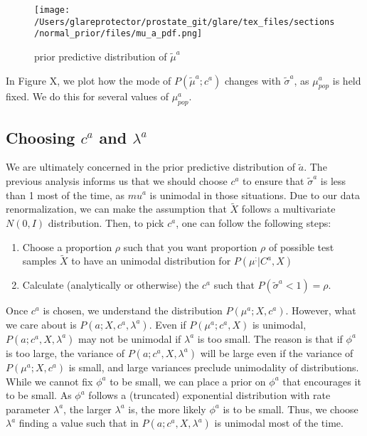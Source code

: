 \begin{figure}
\begin{center}
\texttt{[image: /Users/glareprotector/prostate\_git/glare/tex\_files/sections/normal\_prior/files/mu\_a\_pdf.png]}
\caption{prior predictive distribution of $\tilde{\mu}^a$}
\end{center}
\end{figure}

In Figure X, we plot how the mode of $P(\tilde{\mu}^a;c^a)$ changes with $\tilde{\sigma}^a$, as $\mu_{pop}^a$ is held fixed.  We do this for several values of $\mu_{pop}^a$.

\subsection{Choosing $c^a$ and $\lambda^a$}

We are ultimately concerned in the prior predictive distribution of $\tilde{a}$.  The previous analysis informs us that we should choose $c^a$ to ensure that $\tilde{\sigma}^a$ is less than 1 most of the time, as $mu^a$ is unimodal in those situations.  Due to our data renormalization, we can make the assumption that $\tilde{X}$ follows a multivariate $N(0,I)$ distribution.  Then, to pick $c^a$, one can follow the following steps:

\begin{enumerate}
  \item Choose a proportion $\rho$ such that you want proportion $\rho$ of possible test samples $\tilde{X}$ to have an unimodal distribution for $P(\mu^;|C^a,X)$
  \item Calculate (analytically or otherwise) the $c^a$ such that $P(\tilde{\sigma}^a < 1) = \rho$.
\end{enumerate}

Once $c^a$ is chosen, we understand the distribution $P(\mu^a;X,c^a)$.  However, what we care about is $P(a;X,c^a,\lambda^a)$.  Even if $P(\mu^a;c^a,X)$ is unimodal, $P(a;c^a,X,\lambda^a)$ may not be unimodal if $\lambda^a$ is too small.  The reason is that if $\phi^a$ is too large, the variance of $P(a;c^a,X,\lambda^a)$ will be large even if the variance of $P(\mu^a;X,c^a)$ is small, and large variances preclude unimodality of distributions.  While we cannot fix $\phi^a$ to be small, we can place a prior on $\phi^a$ that encourages it to be small.  As $\phi^a$ follows a (truncated) exponential distribution with rate parameter $\lambda^a$, the larger $\lambda^a$ is, the more likely $\phi^a$ is to be small.  Thus, we choose $\lambda^a$ finding a value such that in $P(a;c^a,X,\lambda^a)$ is unimodal most of the time.